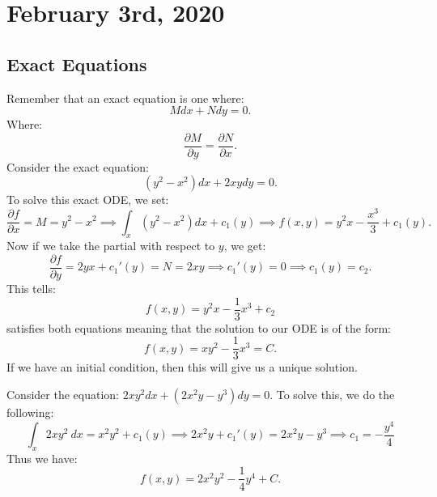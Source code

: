 \documentclass[../main/main.tex]{subfiles}
\begin{document}
\section{February  3rd, 2020}
\subsection{Exact Equations}
Remember that an exact equation is one where: \[
	M dx + N dy = 0
.\] Where: \[
\frac{\partial M}{\partial y} = \frac{\partial N}{\partial x} 
.\] 
Consider the exact equation: \[
	(y^2-x^2)dx+2xydy=0
.\] 
To solve this exact ODE, we set: \[
	\frac{\partial f}{\partial x} =M=y^2-x^2 \implies \int_x (y^2-x^2)dx+c_1(y)\implies f(x,y) = y^2x-\frac{x^{3}}{3}+c_1(y)
.\] 
Now if we take the partial with respect to $y$, we get: \[
	\frac{\partial f}{\partial y} = 2yx+c_1'(y) = N = 2xy \implies c_1'(y) = 0 \implies c_1(y) = c_2
.\] This tells: \[
f(x,y) = y^2x-\frac{1}{3}x^3+c_2
\] satisfies both equations meaning that the solution to our ODE is of the form: \[
f(x,y) =xy^2-\frac{1}{3}x^{3}=C
.\] If we have an initial condition, then this will give us a unique solution.
\begin{example}
	Consider the equation: $2xy^2dx+(2x^2y-y^{3})dy=0$. To solve this, we do the following: \[
		\int_x 2xy^2~dx = x^2y^2+c_1(y) \implies 2x^2y+c_1'(y) = 2x^2y-y^{3} \implies c_1=-\frac{y^{4}}{4}
	\] Thus we have: \[
	f(x,y) = 2x^2y^2-\frac{1}{4}y^{4}+C
	.\] 
\end{example}
\end{document}
